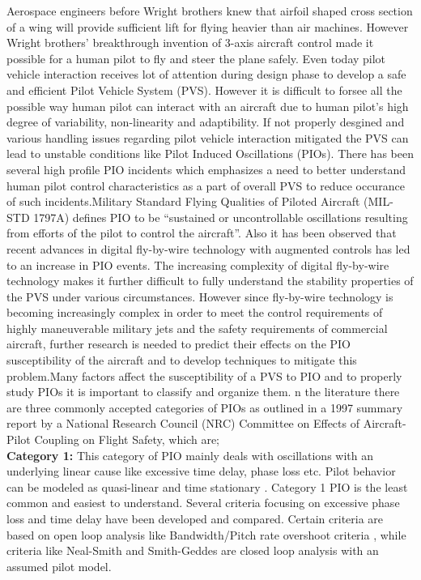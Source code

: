 Aerospace engineers before Wright brothers knew that airfoil shaped cross section of a wing will provide sufficient lift for flying heavier than air machines. However Wright brothers' breakthrough invention of 3-axis aircraft control made it possible for a human pilot to fly and steer the plane safely\cite{birthofflightcontrol}. Even today pilot vehicle interaction receives lot of attention during design phase to develop a safe and efficient Pilot Vehicle System (PVS). However it is difficult to forsee all the possible way human pilot can interact with an aircraft due to human pilot's high degree of variability, non-linearity and adaptibility. If not properly desgined and various handling issues regarding pilot vehicle interaction mitigated the PVS can lead to unstable conditions like Pilot Induced Oscillations (PIOs)\cite{McRuerPIO}. There has been several high profile PIO incidents\cite{SAABPIO}\cite{YF22} which emphasizes a need to better understand human pilot control characteristics as a part of overall PVS to reduce occurance of such incidents.Military Standard Flying Qualities of Piloted Aircraft (MIL-STD 1797A)\cite{MLSTD} defines PIO to be “sustained or uncontrollable oscillations resulting from efforts of the pilot to control the aircraft”. Also it has been observed that recent advances in digital fly-by-wire technology with augmented controls has led to an increase in PIO events\cite{BoeingPIO}\cite{Norton}\cite{hoh1982bandwidth}\cite{hess1991technique}\cite{green1986design}. The increasing complexity of digital fly-by-wire technology makes it  further difficult to fully understand the stability properties of the PVS under various circumstances. However since fly-by-wire technology is becoming increasingly complex in order to meet the control requirements of highly maneuverable military jets and the safety requirements of commercial aircraft, further research is needed to predict their effects on the PIO susceptibility of the aircraft and to develop techniques to mitigate this problem.Many factors affect the susceptibility of a PVS to PIO and to properly study PIOs it is important to classify and organize them. n the literature there are three commonly accepted categories of PIOs as outlined in a 1997 summary report by a National Research Council (NRC) Committee on Effects of Aircraft-Pilot Coupling on Flight Safety\cite{mcruer1997aviation}, which are;\\
\textbf{Category 1:} This category of PIO mainly deals with oscillations with an underlying linear cause like excessive
time delay, phase loss etc. Pilot behavior can be modeled as quasi-linear and time stationary\cite{mcruer1997aviation} . Category 1 PIO is the least common and easiest to understand. Several criteria focusing on excessive phase loss and time delay have been developed and compared\cite{moorhouse2000flight}\cite{liu2010prediction}\cite{garteur1999evaluation}. Certain criteria are based on open loop analysis like Bandwidth/Pitch rate overshoot criteria\cite{mitchell2004recommended} , while criteria like Neal-Smith\cite{neal1970flight} and Smith-Geddes\cite{smith1978effects}\cite{smith1995observations}\cite{mitchell1998critical}\cite{smith1979handling} are closed loop analysis with an assumed pilot model.\\
